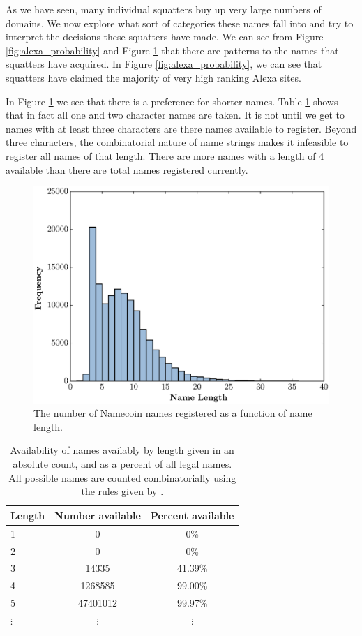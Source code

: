 As we have seen, many individual squatters buy up very large numbers of domains. We now explore what sort of categories these names fall into and try to interpret the decisions these squatters have made. We can see from Figure \ref{fig:alexa_probability} and Figure \ref{fig:name_length_histogram} that there are patterns to the names that squatters have acquired. In Figure \ref{fig:alexa_probability}, we can see that squatters have claimed the majority of very high ranking Alexa sites.

In Figure \ref{fig:name_length_histogram} we see that there is a preference for shorter names. Table \ref{table:names_available} shows that in fact all one and two character names are taken. It is not until we get to names with at least three characters are there names available to register. Beyond three characters, the combinatorial nature of name strings makes it infeasible to register all names of that length. There are more names with a length of 4 available than there are total names registered currently.


\begin{figure}[h]
  \centering
  \includegraphics[width=\columnwidth]{figures/name_length_histogram}
  \caption{The number of Namecoin names registered as a function of name length.}
  \label{fig:name_length_histogram}
\end{figure}

\begin{table}
\begin{tabular}{l | c | c }
Length & Number available & Percent available \\ \hline
1           & 0                & 0\%  \\
2           & 0                & 0\% \\
3           & 14335            & 41.39\% \\
4           & 1268585          & 99.00\% \\
5           & 47401012         & 99.97\% \\
$\vdots$    & $\vdots$         & $\vdots$
\end{tabular}
\caption{Availability of names availably by length given in an absolute count, and as a percent of all legal names. All possible names are counted combinatorially using the rules given by \cite{bitdnsspec}.}
\label{table:names_available}
\end{table}